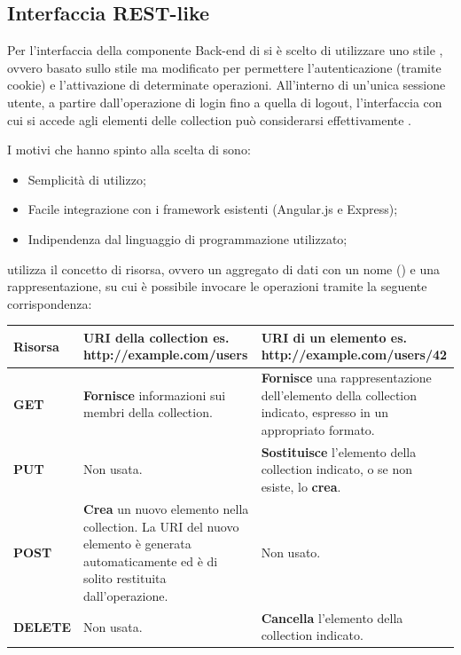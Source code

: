 \subsection{Interfaccia REST-like}
Per l'interfaccia della componente Back-end di \ProjectName{} si è scelto di utilizzare uno stile , ovvero basato sullo stile  ma modificato per permettere l'autenticazione (tramite cookie) e l'attivazione di determinate operazioni. All'interno di un'unica sessione utente, a partire dall'operazione di login fino a quella di logout, l'interfaccia con cui si accede agli elementi delle collection può considerarsi effettivamente .

I motivi che hanno spinto alla scelta di  sono:
\begin{itemize}
	\item Semplicità di utilizzo;
	\item Facile integrazione con i framework esistenti (Angular.js e Express);
	\item Indipendenza dal linguaggio di programmazione utilizzato;
\end{itemize}

 utilizza il concetto di risorsa, ovvero un aggregato di dati con un nome () e una rappresentazione, su cui è possibile invocare le operazioni  tramite la seguente corrispondenza:

\begingroup
\renewcommand*{\arraystretch}{1.5}
\begin{tabularx}{\textwidth}{|P{2.5cm}|X|X|}
\hline
	\textbf{Risorsa} & \textbf{URI della collection} \newline es. http://example.com/users & \textbf{URI di un elemento} \newline es. http://example.com/users/42 \\
\hline
	\textbf{GET} & \textbf{Fornisce} informazioni sui membri della collection. & \textbf{Fornisce} una rappresentazione dell'elemento della collection indicato, espresso in un appropriato formato. \\
\hline
	\textbf{PUT} & Non usata. & \textbf{Sostituisce} l'elemento della collection indicato, o se non esiste, lo \textbf{crea}. \\
\hline
	\textbf{POST} & \textbf{Crea} un nuovo elemento nella collection. La URI del nuovo elemento è generata automaticamente ed è di solito restituita dall'operazione. & Non usato. \\
\hline
	\textbf{DELETE} & Non usata. & \textbf{Cancella} l'elemento della collection indicato. \\
\hline
\end{tabularx}
\endgroup


